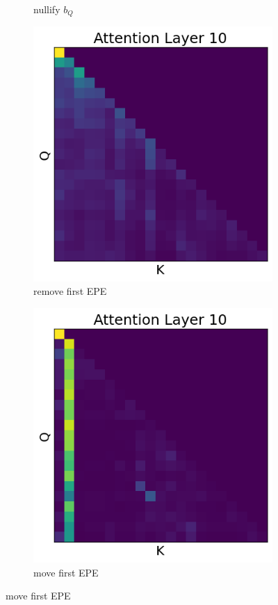 \documentclass[11pt]{article}
\begin{document}
\begin{figure}[t!]
\begin{subfigure}[t]{0.22\textwidth}
    \caption{nullify $b_Q$}
    \label{fig:intervention1}
  \end{subfigure}
  \begin{subfigure}[t]{0.22\textwidth}
    \centering
    \includegraphics[width=0.86\linewidth]{figures/obs4_intervention2.png}
    \caption{remove first EPE}
    \label{fig:intervention2}
  \end{subfigure}
  \begin{subfigure}[t]{0.22\textwidth}
    \centering
    \includegraphics[width=0.86\linewidth]{figures/obs4_intervention3.png}
    \caption{move first EPE}
    \label{fig:intervention3}
  \end{subfigure}



\end{figure}
\end{document}
